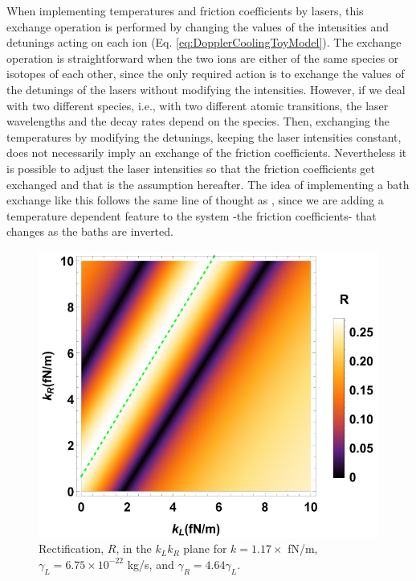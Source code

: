 When implementing temperatures and friction coefficients by lasers, this exchange operation is performed by changing the values of the intensities and detunings acting on each ion (Eq. \eqref{eq:DopplerCoolingToyModel}). The exchange operation is straightforward when the two ions are either of the same species or isotopes of each other, since the only required action is to exchange the values of the detunings of the lasers without modifying the intensities. However, if we deal with two different species, i.e., with two different atomic transitions, the laser wavelengths and the decay rates  depend on the species. Then, exchanging the temperatures by modifying the detunings, keeping the laser intensities constant, does not necessarily imply an exchange of the friction coefficients. Nevertheless it is possible to adjust the laser intensities so that the friction coefficients get exchanged and that is the assumption hereafter. The idea of implementing a bath exchange like this follows the same line of thought as \cite{Pereira2017}, since we are adding a temperature dependent feature to the system -the friction coefficients- that changes as the baths are inverted.

\begin{figure}
  \includegraphics[width=\linewidth]{Figures/RwMPlota.pdf}
  \caption{Rectification, $R$, in the $k_L k_R$ plane for $k = 1.17 \times$ fN/m, $\gamma_L = 6.75\times 10^{-22}$ kg/s, and $\gamma_R = 4.64\gamma_L$.}
  \label{fig:Fig_rectification_K_plane}
\end{figure}

